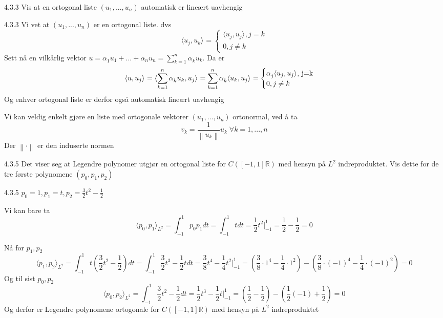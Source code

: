 \documentclass[a4paper,norsk]{article}
\begin{document}
\begin{oppgavebox}{4.3.3}{}
Vis at en ortogonal liste $ \left( u_1, ..., u_n \right)  $ automatisk er lineært uavhengig
\begin{proofbox}{4.3.3}{}
Vi vet at $ \left( u_1, ..., u_n \right)  $ er en ortogonal liste. dvs
\[
    \langle u_j, u_k \rangle_{  } = \begin{cases}
        \langle u_j, u_j \rangle_{  }, j=k \\
        0, j\neq k
    \end{cases}
\]
Sett nå en vilkårlig vektor $ u = \alpha_{1}^{} u_1 + ... + \alpha_{n}^{} u_n  = \sum_{ k=1 }^{ n } \alpha_{k}^{} u_k $. Da er 
\[
    \langle u, u_j \rangle_{  } = \langle \sum_{ k=1 }^{ n } \alpha_{k}^{} u_k, u_j \rangle_{  } = \sum_{ k=1 }^{ n } \alpha_{k}^{} \langle u_k, u_j \rangle_{  } = \begin{cases}
        \alpha_{j}^{} \langle u_j, u_j \rangle_{  }, $ j=k $  \\
        0, j\neq k
    \end{cases}
\]
Og enhver ortogonal liste er derfor også automatisk lineært uavhengig
\end{proofbox}
\end{oppgavebox}

Vi kan veldig enkelt gjøre en liste med ortogonale vektorer $ \left( u_1, ..., u_n \right)  $   ortonormal, ved å ta 
\[
    v_k = \frac{ 1 }{ \left\lVert u_k \right\rVert  } u_k \; \forall k=1, ..., n
\]
Der $ \left\lVert \cdot  \right\rVert  $ er den induserte normen

\begin{oppgavebox}{4.3.5}{}
Det viser seg at Legendre polynomer utgjør en ortogonal liste for $ C \left( \left[ -1 , 1 \right] \mathbb{R} \right)  $ med hensyn på $ L^2 $ indreproduktet. Vis dette for de tre første polynomene $ \left( p_0, p_1, p_2 \right)  $ 
\begin{proofbox}{4.3.5}{}
$ p_0 = 1, p_1 = t, p_2 = \frac{ 3 }{ 2 }t^2 - \frac{ 1 }{ 2 } $ 

Vi kan bare ta \[
    \langle p_0, p_1 \rangle_{ L^2 }   = \int_{-1}^{1} p_0 p_1 dt = \int_{-1}^{1} t dt = \frac{ 1 }{ 2 }t^2 |_{-1}^{1} = \frac{ 1 }{ 2 } - \frac{ 1 }{ 2 } =0     
\]

Nå for $ p_1, p_2 $ 
\[
    \langle p_1, p_2 \rangle_{ L^2 } = \int_{-1}^{1} t \left( \frac{ 3 }{ 2 }t^2 - \frac{ 1 }{ 2 } \right)  dt = \int_{-1}^{1} \frac{ 3 }{ 2 } t^3 - \frac{ 1 }{ 2 }t dt = \frac{ 3 }{ 8 }t^4 - \frac{ 1 }{ 4 }t^2 |_{-1}^1 = \left( \frac{ 3 }{ 8 } \cdot 1^4 - \frac{ 1 }{ 4 } \cdot 1^2  \right)  - \left( \frac{ 3 }{ 8 } \cdot (-1)^4 - \frac{ 1 }{ 4 } \cdot (-1)^2 \right) = 0
\]
Og til sist $ p_0, p_2 $ 
\[
    \langle p_0, p_2  \rangle_{ L^2 } = \int_{-1}^{1} \frac{ 3 }{ 2 }t^2 - \frac{ 1 }{ 2 }dt = \frac{ 1 }{ 2 }t^3 - \frac{ 1 }{ 2 }t |_{-1}^1 = \left( \frac{ 1 }{ 2 } - \frac{ 1 }{ 2 } \right)   - \left( \frac{ 1 }{ 2 } (-1) + \frac{ 1 }{ 2 } \right) = 0
\]
Og derfor er Legendre polynomene ortogonale for $ C \left( \left[ -1, 1 \right] \mathbb{R} \right)  $ med hensyn på $ L^2 $ indreproduktet
\end{proofbox}
\end{oppgavebox}
\end{document}
